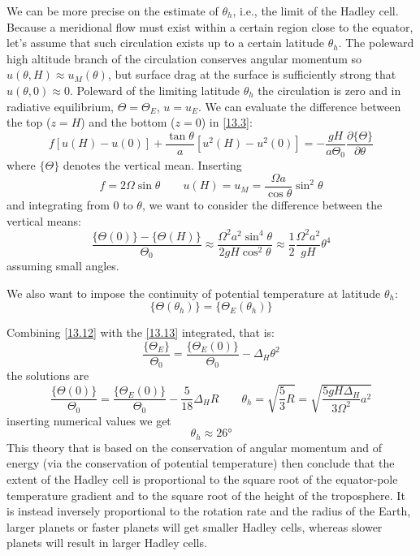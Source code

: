 We can be more precise on the estimate of $\theta_h$, i.e., the limit of the Hadley cell. Because a meridional flow must exist within a certain region close to the equator, let's assume that such circulation exists up to a certain latitude $\theta_h$. The poleward high altitude branch of the circulation conserves angular momentum so  $u(\theta,H)\approx u_M(\theta)$, but surface drag at the surface is sufficiently strong that $u(\theta,0)\approx 0$. Poleward of the limiting latitude $\theta_h$ the circulation is zero and in radiative equilibrium, $\Theta=\Theta_E$, $u=u_E$. We can evaluate the difference between the top ($z=H$) and the bottom ($z=0$) in \ref{13.3}:
\begin{equation}\label{13.10}
    f[u(H)-u(0)]+\frac{\tan\theta}{a}[u^2(H)-u^2(0)]=-\frac{gH}{a\Theta_0}\frac{\partial\{\Theta\}}{\partial\theta}
\end{equation}
where $\{\Theta\}$ denotes the vertical mean. Inserting 
$$f=2\Omega\sin\theta\qquad u(H)=u_M=\frac{\Omega a}{\cos\theta}\sin^2\theta$$
and integrating from $0$ to $\theta$, we want to consider the difference between the vertical means:
\begin{equation}\label{13.12}
    \frac{\{\Theta(0)\}-\{\Theta(H)\}}{\Theta_0}\approx\frac{\Omega^2a^2\sin^4\theta}{2gH\cos^2\theta}\approx \frac{1}{2}\frac{\Omega^2a^2}{gH}\theta^4
\end{equation}
assuming small angles. 

We also want to impose the continuity of potential temperature at latitude $\theta_h$:
\begin{equation}\label{13.13}
    \{\Theta(\theta_h)\}=\{\Theta_E(\theta_h)\}
\end{equation}

Combining \ref{13.12} with the \ref{13.13} integrated, that is:
$$\frac{\{\Theta_E\}}{\Theta_0}=\frac{\{\Theta_E(0)\}}{\Theta_0}-\Delta_H\theta^2$$
the solutions are
\begin{equation}
    \frac{\{\Theta(0)\}}{\Theta_0}=\frac{\{\Theta_E(0)\}}{\Theta_0}-\frac{5}{18}\Delta_HR\qquad \theta_h=\sqrt{\frac{5}{3}R}=\sqrt{\frac{5gH\Delta_H}{3\Omega^2}a^2}
\end{equation}
inserting numerical values we get
\begin{equation}\label{thetahadl}
    \theta_h\approx  26\text{°}
\end{equation}
This theory that is based on the conservation of angular momentum and of energy (via the conservation of potential temperature) then conclude that the extent of the Hadley cell is proportional to the square root of the equator-pole temperature gradient and to the square root of the height of the troposphere. It is instead inversely proportional to the rotation rate and the radius of the Earth, larger planets or faster planets will get smaller Hadley cells, whereas slower planets will result in larger Hadley cells.\\



